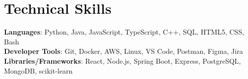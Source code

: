 \documentclass[letterpaper,11pt]{article}
\begin{document}
\section{Technical Skills}
 \begin{itemize}[leftmargin=0.15in, label={}]
    \small{\item{   
     \textbf{Languages}{: Python, Java, JavaScript, TypeScript, C++, SQL, HTML5, CSS, Bash} \\[1mm]
     \textbf{Developer Tools}{: Git, Docker, AWS, Linux, VS Code, Postman, Figma, Jira} \\[1mm]
     \textbf{Libraries/Frameworks}{: React, Node.js, Spring Boot, Express, PostgreSQL, MongoDB, scikit-learn} \\ [1mm]
    }}
 \end{itemize}
 \vspace{-16pt}
 \vspace{3pt}
\vspace{10pt}

\vspace{-15pt}
\end{document}

